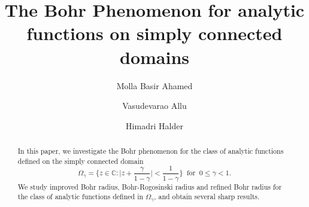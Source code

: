 \documentclass[a4paper,12pt]{amsart}
\theoremstyle{plain}
\theoremstyle{definition}
\newcounter{minutes}\setcounter{minutes}{\time}
\newcounter{hours}\setcounter{hours}{\time}
\begin{document}
\title{The Bohr Phenomenon for analytic functions on simply connected domains}

\author{Molla Basir Ahamed}
\address{Molla Basir Ahamed,
	School of Basic Science,
	Indian Institute of Technology Bhubaneswar,
	Bhubaneswar-752050, Odisha, India.}

\author{Vasudevarao Allu}
\address{Vasudevarao Allu,
School of Basic Science,
Indian Institute of Technology Bhubaneswar,
Bhubaneswar-752050, Odisha, India.}

\author{Himadri Halder}
\address{Himadri Halder,
School of Basic Science,
Indian Institute of Technology Bhubaneswar,
Bhubaneswar-752050, Odisha, India.}




\def\thefootnote{}
 \makeatletter\def\thefootnote{\@arabic\c@footnote}\makeatother



\begin{abstract}
 In this paper, we investigate the Bohr phenomenon for the class of analytic functions defined on the simply connected domain
 \begin{equation*}
 	\Omega_{\gamma}=\bigg\{z\in\mathbb{C} : \bigg|z+\frac{\gamma}{1-\gamma}\bigg|<\frac{1}{1-\gamma}\bigg\}\;\; \text{for}\;\; 0\leq \gamma<1.
 \end{equation*}
We study improved Bohr radius, Bohr-Rogosinski radius and refined Bohr radius for the class of analytic functions defined in $ \Omega_{\gamma} $, and obtain several sharp results. 
\end{abstract}



\maketitle
\pagestyle{myheadings}
\end{document}
